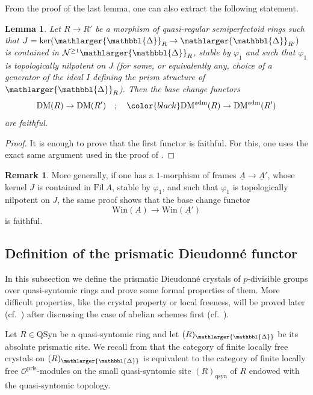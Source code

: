 \documentclass{amsart}
\newcommand{\prism}{{\mathlarger{\mathbbl{\Delta}}}}
\theoremstyle{plain}
\newtheorem{lemma}[theorem]{Lemma}
\theoremstyle{definition}
\newtheorem{remark}[theorem]{Remark}
\newcommand{\pris}{\mathrm{pris}}
\newcommand{\DM}{\mathrm{DM}}
\newcommand{\red}[1]{{\color{black} #1}}
\begin{document}
From the proof of the last lemma, one can also extract the following statement.
\begin{lemma}
  \label{sec:essent-surj-lemma-faithful-dieudonne-modules-divid-frob-top-nilpotent}
Let $R \to R'$ be a morphism of quasi-regular semiperfectoid rings such that $J=\ker(\prism_R \to \prism_{R'})$ is contained in $\mathcal{N}^{\geq 1} \prism_R$, stable by $\varphi_1$ and such that $\varphi_1$ is topologically nilpotent on $J$ (for some, or equivalently any, choice of a generator of the ideal $I$ defining the prism structure of $\prism_R$). Then the base change functors
\[ \mathrm{DM}(R) \to \mathrm{DM}(R') \quad ; \quad \red{\DM^{\rm adm}(R) \to \DM^{\rm adm}(R')} \]
are faithful.
\end{lemma}
\begin{proof}
It is enough to prove that the first functor is faithful. For this, one uses the exact same argument used in the proof of .
\end{proof}

\begin{remark}
  \label{sec:abstr-filt-prism-remark-faithfulness-on-windows-if-divided-frob-is-topologically-nilpotent}
More generally, if one has a $1$-morphism of frames $\underline{A} \to \underline{A}'$, whose kernel $J$ is contained in $\mathrm{Fil}~ A$, stable by $\varphi_1$, and such that $\varphi_1$ is topologically nilpotent on $J$, the same proof shows that the base change functor
\[ \mathrm{Win}(\underline{A}) \to \mathrm{Win}(\underline{A}') \]
is faithful. 
\end{remark}

\subsection{Definition of the prismatic Dieudonn\'e functor}
\label{sec:divid-prism-dieud-definition-divided-prismatic-dieudonne-crystals}

In this subsection we define the prismatic Dieudonn\'e crystals of $p$-divisible groups over quasi-syntomic rings and prove some formal properties of them. More difficult properties, like the crystal property or local freeness, will be proved later (cf.\ ) after discussing the case of abelian schemes first (cf.\ ).

Let $R\in \mathrm{QSyn}$ be a quasi-syntomic ring and let $(R)_\prism$ be its absolute prismatic site. We recall from  that the category of finite locally free crystals on $(R)_{\prism}$ is equivalent to the category of finite locally free $\mathcal{O}^{\pris}$-modules on the small quasi-syntomic site $(R)_{\mathrm{qsyn}}$ of $R$ endowed with the quasi-syntomic topology.
\end{document}
